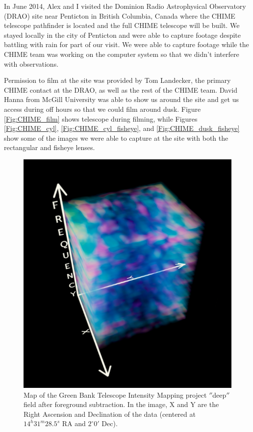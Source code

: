 In June 2014, Alex and I visited the Dominion Radio Astrophysical Observatory (DRAO) site near Penticton in British Columbia, Canada where the CHIME telescope pathfinder is located and the full CHIME telescope will be built. We stayed locally in the city of Penticton and were able to capture footage despite battling with rain for part of our visit. We were able to capture footage while the CHIME team was working on the computer system so that we didn't interfere with observations. 

Permission to film at the site was provided by Tom Landecker, the primary CHIME contact at the DRAO, as well as the rest of the CHIME team. David Hanna from McGill University was able to show us around the site and get us access during off hours so that we could film around dusk. Figure \ref{Fig:CHIME_film} shows telescope during filming, while Figures \ref{Fig:CHIME_cyl}, \ref{Fig:CHIME_cyl_fisheye}, and \ref{Fig:CHIME_dusk_fisheye} show some of the images we were able to capture at the site with both the rectangular and fisheye lenses. 

\begin{figure}[htb]
\begin{center}
\includegraphics[width=0.95\linewidth]{Planetarium/figures/GBT_cm_map.jpg}
\caption{Map of the Green Bank Telescope Intensity Mapping project $''$deep$''$ field after foreground subtraction. In the image, X and Y are the Right Ascension and Declination of the data (centered at $14^h 31^m 28.5^s$ RA and $2^\circ 0'$ Dec). }
\label{Fig:GBT_cm_map}
\end{center}
\end{figure}



